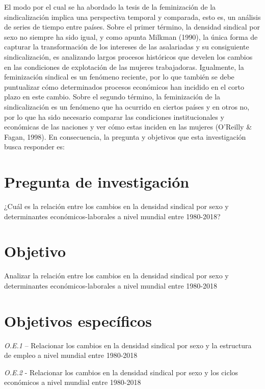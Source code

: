 \documentclass[
]{book}
\begin{document}
El modo por el cual se ha abordado la tesis de la feminización de la sindicalización implica una perspectiva temporal y comparada, esto es, un análisis de series de tiempo entre países. Sobre el primer término, la densidad sindical por sexo no siempre ha sido igual, y como apunta Milkman (1990), la única forma de capturar la transformación de los intereses de las asalariadas y su consiguiente sindicalización, es analizando largos procesos históricos que develen los cambios en las condiciones de explotación de las mujeres trabajadoras. Igualmente, la feminización sindical es un fenómeno reciente, por lo que también se debe puntualizar cómo determinados procesos económicos han incidido en el corto plazo en este cambio. Sobre el segundo término, la feminización de la sindicalización es un fenómeno que ha ocurrido en ciertos países y en otros no, por lo que ha sido necesario comparar las condiciones institucionales y económicas de las naciones y ver cómo estas inciden en las mujeres (O'Reilly \& Fagan, 1998). En consecuencia, la pregunta y objetivos que esta investigación busca responder es:

\hypertarget{pregunta-de-investigaciuxf3n}{%
\section{Pregunta de investigación}\label{pregunta-de-investigaciuxf3n}}

¿Cuál es la relación entre los cambios en la densidad sindical por sexo y determinantes económicos-laborales a nivel mundial entre 1980-2018?

\hypertarget{objetivo}{%
\section{Objetivo}\label{objetivo}}

Analizar la relación entre los cambios en la densidad sindical por sexo y determinantes económicos-laborales a nivel mundial entre 1980-2018

\hypertarget{objetivos-especuxedficos}{%
\section{Objetivos específicos}\label{objetivos-especuxedficos}}

\emph{O.E.1} -- Relacionar los cambios en la densidad sindical por sexo y la estructura de empleo a nivel mundial entre 1980-2018

\emph{O.E.2} - Relacionar los cambios en la densidad sindical por sexo y los ciclos económicos a nivel mundial entre 1980-2018
\end{document}
